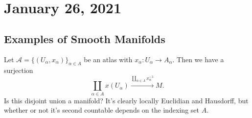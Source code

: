 \section{January 26, 2021}

\subsection{Examples of Smooth Manifolds}
Let $\mathcal{A} = \{(U _{\alpha }, x _{\alpha })\} _{\alpha \in A}$ be an atlas with $x _{\alpha}  \colon U_{\alpha } \to A_{\alpha }. $ Then we have a surjection \[
    \coprod _{\alpha \in  A} x (U_{\alpha }) \xrightarrow{\underset{\alpha \in A}{\coprod} x _{\alpha }^{-1}}  M.
\] Is this disjoint union a manifold? It's clearly locally Euclidian and Hausdorff, but whether or not it's second countable depends on the indexing set $A$.
